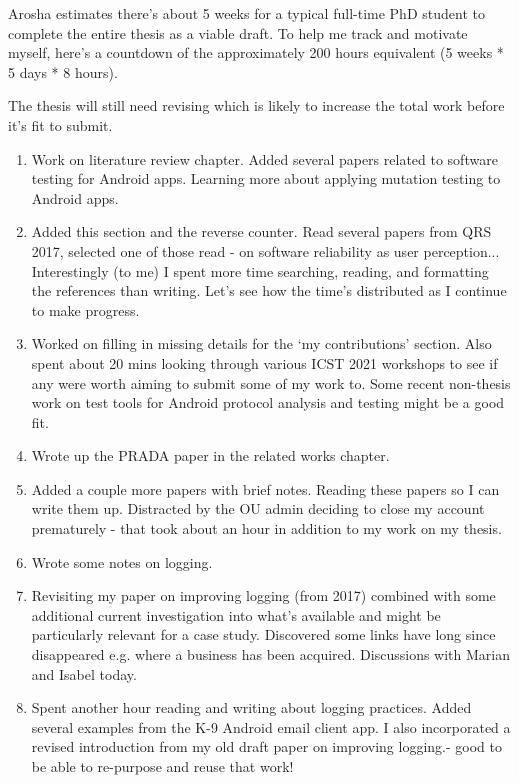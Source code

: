 \label{section-thesis-countdown}
Arosha estimates there's about 5 weeks for a typical full-time PhD student to complete the entire thesis as a viable draft. To help me track and motivate myself, here's a countdown of the approximately 200 hours equivalent (5 weeks * 5 days * 8 hours).

The thesis will still need revising which is likely to increase the total work before it's fit to submit.
\newcommand\reverselabel[1]{%
  \def\theenumi{}%
  \renewcommand\makelabel{\makebox[\dimexpr\labelwidth-3pt\relax][r]{%
    \the\numexpr#1-\value{enumi}+1\relax}}}%

\begin{enumerate}
    \reverselabel{200}
    \item Work on literature review chapter. Added several papers related to software testing for Android apps. Learning more about applying mutation testing to Android apps.
    \item Added this section and the reverse counter. Read several papers from QRS 2017, selected one of those read - on software reliability as user perception... Interestingly (to me) I spent more time searching, reading, and formatting the references than writing. Let's see how the time's distributed as I continue to make progress.
    \item Worked on filling in missing details for the `my contributions' section. Also spent about 20 mins looking through various ICST 2021 workshops to see if any were worth aiming to submit some of my work to. Some recent non-thesis work on test tools for Android protocol analysis and testing might be a good fit.
    \item Wrote up the PRADA paper in the related works chapter. 
    \item Added a couple more papers with brief notes. Reading these papers so I can write them up. Distracted by the OU admin deciding to close my account prematurely - that took about an hour in addition to my work on my thesis.
    \item Wrote some notes on logging.
    \item Revisiting my paper on improving logging (from 2017) combined with some additional current investigation into what's available and might be particularly relevant for a case study. Discovered some links have long since disappeared e.g. where a business has been acquired. Discussions with Marian and Isabel today.
    \item Spent another hour reading and writing about logging practices. Added several examples from the K-9 Android email client app. I also incorporated a revised introduction from my old draft paper on improving logging.- good to be able to re-purpose and reuse that work!

\end{enumerate}
